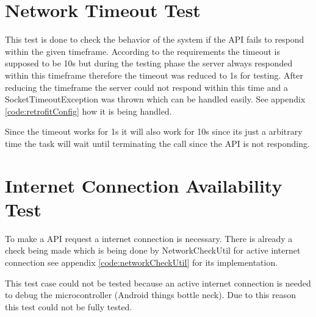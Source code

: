 \section{Network Timeout Test}
    This test is done to check the behavior of the system
    if the API fails to respond within the
    given timeframe. According to the requirements
    the timeout is supposed to be 10s but during the testing phase 
    the server always responded within this timeframe therefore the
    timeout was reduced to 1s for testing. After
    reducing the timeframe the server could not respond within this time 
    and a SocketTimeoutException was thrown which can be handled easily. See
    appendix
    \ref{code:retrofitConfig} how it is being handled. 

    Since the timeout works for 1s it will also work for 10s since its just a arbitrary
    time the task will wait until terminating the call since the API is not responding. 

\section{Internet Connection Availability Test}
    \label{sec:internetConnectionTest}
    To make a API request a internet connection is necessary. There is 
    already a check being made which is being done by
    NetworkCheckUtil for active internet connection see appendix
    \ref{code:networkCheckUtil} for its implementation.

    This test case could not be tested because an active internet connection
    is needed to debug the microcontroller (Android things bottle neck). Due to this reason this test could not
    be fully tested.
    